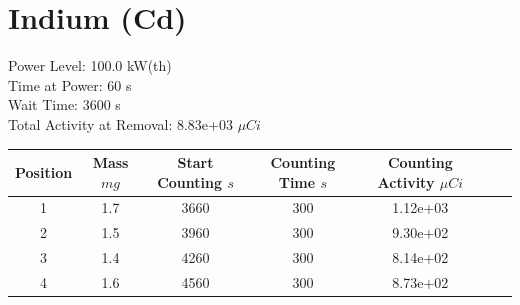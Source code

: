 \newpage

\section*{ Indium  (Cd) }

Power Level: 100.0 kW(th) \\
Time at Power: 60 s \\
Wait Time: 3600 s \\
Total Activity at Removal: 8.83e+03 $\mu Ci$

\begin{table}[h]
\centering
\begin{tabular}{ |c|c|c|c|c|c|c| }
 \hline
 Position & Mass $mg$ & Start Counting $s$ & Counting Time $s$ & Counting Activity $\mu Ci$ \\
 \hline 
 1 & 1.7 & 3660 & 300 & 1.12e+03\\ 
\hline
 2 & 1.5 & 3960 & 300 & 9.30e+02\\ 
\hline
 3 & 1.4 & 4260 & 300 & 8.14e+02\\ 
\hline
 4 & 1.6 & 4560 & 300 & 8.73e+02\\ 
\hline
\end{tabular}
\end{table}

\begin{figure}[!ht]
   \centering
   \quad
   \\ 
   \quad 

\end{figure}

